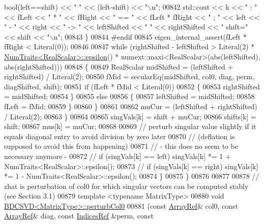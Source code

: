 \begin{DoxyCode}
      bool(left==shift) << \textcolor{stringliteral}{" "} << (left-shift) << \textcolor{stringliteral}{"\(\backslash\)n"};
00842         std::cout << k << \textcolor{stringliteral}{" : "} <<  fLeft << \textcolor{stringliteral}{" * "} << fRight << \textcolor{stringliteral}{" == "} << fLeft * fRight << \textcolor{stringliteral}{"  ;  "} << left
       << \textcolor{stringliteral}{" - "} << right << \textcolor{stringliteral}{" -> "} <<  leftShifted << \textcolor{stringliteral}{" "} << rightShifted << \textcolor{stringliteral}{"   shift="} << shift << \textcolor{stringliteral}{"\(\backslash\)n"};
00843       \}
00844 \textcolor{preprocessor}{#endif}
00845       eigen\_internal\_assert(fLeft * fRight < Literal(0));
00846       
00847       \textcolor{keywordflow}{while} (rightShifted - leftShifted > Literal(2) * 
      \hyperlink{group___core___module_struct_eigen_1_1_num_traits}{NumTraits<RealScalar>::epsilon}() * numext::maxi<RealScalar>(abs(leftShifted),
       abs(rightShifted)))
00848       \{
00849         RealScalar midShifted = (leftShifted + rightShifted) / Literal(2);
00850         fMid = secularEq(midShifted, col0, diag, perm, diagShifted, shift);
00851         \textcolor{keywordflow}{if} (fLeft * fMid < Literal(0))
00852         \{
00853           rightShifted = midShifted;
00854         \}
00855         \textcolor{keywordflow}{else}
00856         \{
00857           leftShifted = midShifted;
00858           fLeft = fMid;
00859         \}
00860       \}
00861 
00862       muCur = (leftShifted + rightShifted) / Literal(2);
00863     \}
00864       
00865     singVals[k] = shift + muCur;
00866     shifts[k] = shift;
00867     mus[k] = muCur;
00868 
00869     \textcolor{comment}{// perturb singular value slightly if it equals diagonal entry to avoid division by zero later}
00870     \textcolor{comment}{// (deflation is supposed to avoid this from happening)}
00871     \textcolor{comment}{// - this does no seem to be necessary anymore -}
00872 \textcolor{comment}{//     if (singVals[k] == left) singVals[k] *= 1 + NumTraits<RealScalar>::epsilon();}
00873 \textcolor{comment}{//     if (singVals[k] == right) singVals[k] *= 1 - NumTraits<RealScalar>::epsilon();}
00874   \}
00875 \}
00876 
00877 
00878 \textcolor{comment}{// zhat is perturbation of col0 for which singular vectors can be computed stably (see Section 3.1)}
00879 \textcolor{keyword}{template} <\textcolor{keyword}{typename} MatrixType>
00880 \textcolor{keywordtype}{void} \hyperlink{group___s_v_d___module_class_eigen_1_1_b_d_c_s_v_d}{BDCSVD<MatrixType>::perturbCol0}
00881    (\textcolor{keyword}{const} \hyperlink{group___core___module_class_eigen_1_1_ref}{ArrayRef}& col0, \textcolor{keyword}{const} \hyperlink{group___core___module_class_eigen_1_1_ref}{ArrayRef}& diag, \textcolor{keyword}{const} \hyperlink{group___core___module_class_eigen_1_1_ref}{IndicesRef} &perm, \textcolor{keyword}{const} 

\end{DoxyCode}
